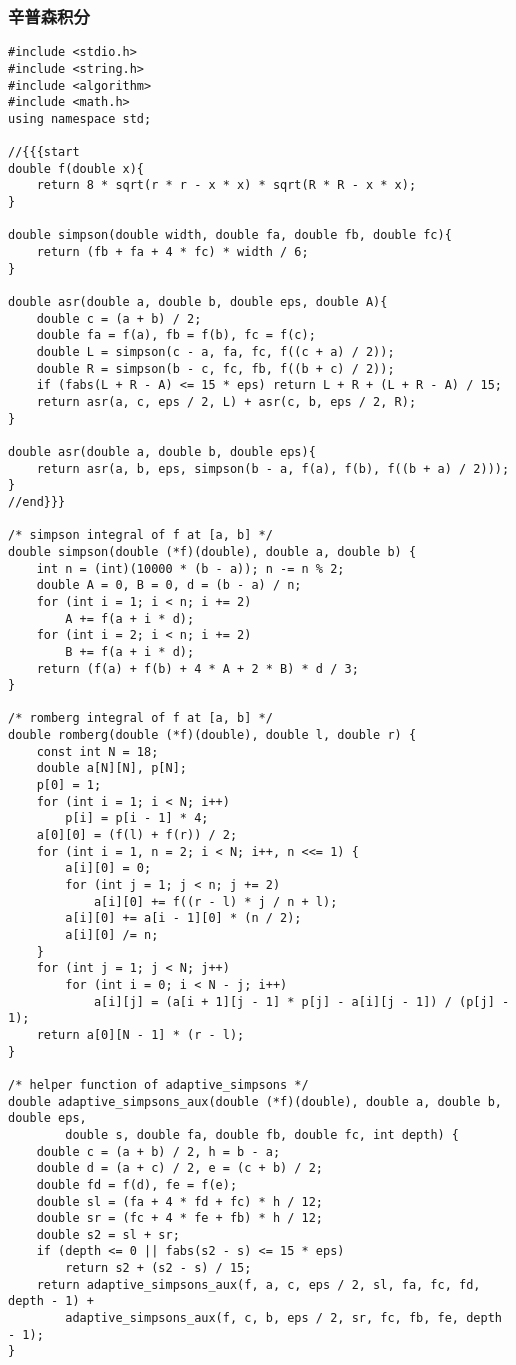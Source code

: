\subsubsection{辛普森积分}
\begin{verbatim}
#include <stdio.h>
#include <string.h>
#include <algorithm>
#include <math.h>
using namespace std;

//{{{start
double f(double x){
    return 8 * sqrt(r * r - x * x) * sqrt(R * R - x * x);
}

double simpson(double width, double fa, double fb, double fc){
    return (fb + fa + 4 * fc) * width / 6;
}

double asr(double a, double b, double eps, double A){
    double c = (a + b) / 2;
    double fa = f(a), fb = f(b), fc = f(c);
    double L = simpson(c - a, fa, fc, f((c + a) / 2));
    double R = simpson(b - c, fc, fb, f((b + c) / 2));
    if (fabs(L + R - A) <= 15 * eps) return L + R + (L + R - A) / 15;
    return asr(a, c, eps / 2, L) + asr(c, b, eps / 2, R);
}

double asr(double a, double b, double eps){
    return asr(a, b, eps, simpson(b - a, f(a), f(b), f((b + a) / 2)));
}
//end}}}

/* simpson integral of f at [a, b] */
double simpson(double (*f)(double), double a, double b) {
    int n = (int)(10000 * (b - a)); n -= n % 2;
    double A = 0, B = 0, d = (b - a) / n;
    for (int i = 1; i < n; i += 2)
        A += f(a + i * d);
    for (int i = 2; i < n; i += 2)
        B += f(a + i * d);
    return (f(a) + f(b) + 4 * A + 2 * B) * d / 3;
}

/* romberg integral of f at [a, b] */
double romberg(double (*f)(double), double l, double r) {
    const int N = 18;
    double a[N][N], p[N];
    p[0] = 1;
    for (int i = 1; i < N; i++)
        p[i] = p[i - 1] * 4;
    a[0][0] = (f(l) + f(r)) / 2;
    for (int i = 1, n = 2; i < N; i++, n <<= 1) {
        a[i][0] = 0;
        for (int j = 1; j < n; j += 2)
            a[i][0] += f((r - l) * j / n + l);
        a[i][0] += a[i - 1][0] * (n / 2);
        a[i][0] /= n;
    }
    for (int j = 1; j < N; j++)
        for (int i = 0; i < N - j; i++)
            a[i][j] = (a[i + 1][j - 1] * p[j] - a[i][j - 1]) / (p[j] - 1);
    return a[0][N - 1] * (r - l);
}

/* helper function of adaptive_simpsons */
double adaptive_simpsons_aux(double (*f)(double), double a, double b, double eps,
        double s, double fa, double fb, double fc, int depth) {
    double c = (a + b) / 2, h = b - a;
    double d = (a + c) / 2, e = (c + b) / 2;
    double fd = f(d), fe = f(e);
    double sl = (fa + 4 * fd + fc) * h / 12;
    double sr = (fc + 4 * fe + fb) * h / 12;
    double s2 = sl + sr;
    if (depth <= 0 || fabs(s2 - s) <= 15 * eps)
        return s2 + (s2 - s) / 15;
    return adaptive_simpsons_aux(f, a, c, eps / 2, sl, fa, fc, fd, depth - 1) +
        adaptive_simpsons_aux(f, c, b, eps / 2, sr, fc, fb, fe, depth - 1);
}


\end{verbatim}

